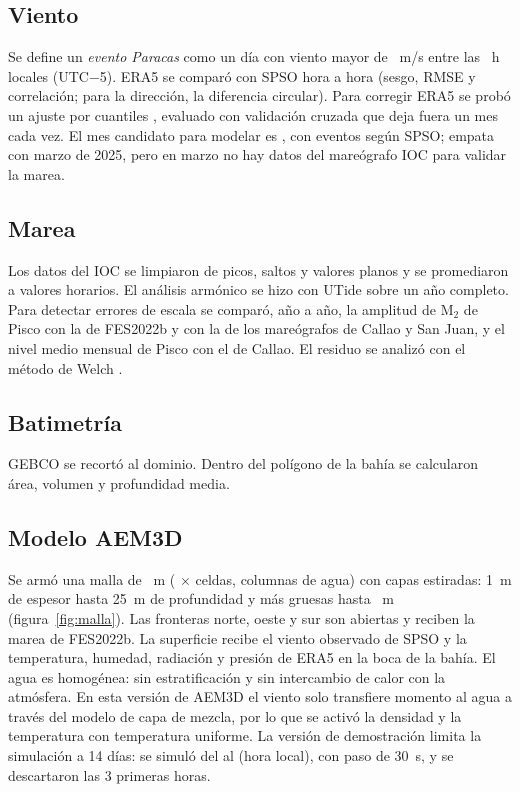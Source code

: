 \documentclass[11pt,a4paper]{article}
\begin{document}
\subsection{Viento}
Se define un \emph{evento Paracas} como un día con viento mayor de \umbralParacas~m/s entre las
\ventanaParacas~h locales (UTC$-$5). ERA5 se comparó con SPSO hora a hora (sesgo, RMSE y correlación; para
la dirección, la diferencia circular). Para corregir ERA5 se probó un ajuste por cuantiles
\cite{panofsky,maraun}, evaluado con validación cruzada que deja fuera un mes cada vez. El mes candidato
para modelar es \mesCandidato, con \eventosCandidato{} eventos según SPSO; empata con marzo de 2025, pero en
marzo no hay datos del mareógrafo IOC para validar la marea.

\subsection{Marea}
Los datos del IOC se limpiaron de picos, saltos y valores planos y se promediaron a valores horarios. El
análisis armónico se hizo con UTide \cite{utide,ttide} sobre un año completo. Para detectar errores de
escala se comparó, año a año, la amplitud de M$_2$ de Pisco con la de FES2022b y con la de los mareógrafos de
Callao y San Juan, y el nivel medio mensual de Pisco con el de Callao. El residuo se analizó con el método de
Welch \cite{welch}.

\subsection{Batimetría}
GEBCO se recortó al dominio. Dentro del polígono de la bahía se calcularon área, volumen y profundidad media.

\subsection{Modelo AEM3D}
Se armó una malla de \mallaDx~m (\mallaFilas{} $\times$ \mallaColumnas{} celdas, \mallaAgua{} columnas de agua)
con \mallaCapas{} capas estiradas: 1~m de espesor hasta 25~m de profundidad y más gruesas hasta
\mallaProfMax~m (figura~\ref{fig:malla}). Las fronteras norte, oeste y sur son abiertas y reciben la marea de
FES2022b. La superficie recibe el viento observado de SPSO y la temperatura, humedad, radiación y presión de ERA5 en la
boca de la bahía. El agua es
homogénea: sin estratificación y sin intercambio de calor con la atmósfera. En esta versión de AEM3D el
viento solo transfiere momento al agua a través del modelo de capa de mezcla, por lo que se activó la
densidad y la temperatura con temperatura uniforme. La versión de demostración limita la simulación a 14 días:
se simuló del \aemInicio{} al \aemFin{} (hora local), con paso de 30~s, y se descartaron las 3 primeras horas.
\end{document}
